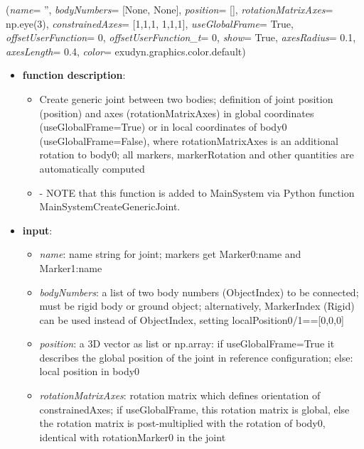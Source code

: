 %
\begin{flushleft}
\label{sec:mainsystemextensions:CreateGenericJoint}
({\it name}= '', {\it bodyNumbers}= [None, None], {\it position}= [], {\it rotationMatrixAxes}= np.eye(3), {\it constrainedAxes}= [1,1,1, 1,1,1], {\it useGlobalFrame}= True, {\it offsetUserFunction}= 0, {\it offsetUserFunction\_t}= 0, {\it show}= True, {\it axesRadius}= 0.1, {\it axesLength}= 0.4, {\it color}= exudyn.graphics.color.default)
\end{flushleft}
\setlength{\itemindent}{0.7cm}
\begin{itemize}[leftmargin=0.7cm]
\item[--]
{\bf function description}: \vspace{-6pt}
\begin{itemize}[leftmargin=1.2cm]
\setlength{\itemindent}{-0.7cm}
\item[]Create generic joint between two bodies; definition of joint position (position) and axes (rotationMatrixAxes) in global coordinates (useGlobalFrame=True) or in local coordinates of body0 (useGlobalFrame=False), where rotationMatrixAxes is an additional rotation to body0; all markers, markerRotation and other quantities are automatically computed
\item[]- NOTE that this function is added to MainSystem via Python function MainSystemCreateGenericJoint.
\end{itemize}
\item[--]
{\bf input}: \vspace{-6pt}
\begin{itemize}[leftmargin=1.2cm]
\setlength{\itemindent}{-0.7cm}
\item[]{\it name}: name string for joint; markers get Marker0:name and Marker1:name
\item[]{\it bodyNumbers}: a list of two body numbers (ObjectIndex) to be connected; must be rigid body or ground object; alternatively, MarkerIndex (Rigid) can be used instead of ObjectIndex, setting localPosition0/1==[0,0,0]
\item[]{\it position}: a 3D vector as list or np.array: if useGlobalFrame=True it describes the global position of the joint in reference configuration; else: local position in body0
\item[]{\it rotationMatrixAxes}: rotation matrix which defines orientation of constrainedAxes; if useGlobalFrame, this rotation matrix is global, else the rotation matrix is post-multiplied with the rotation of body0, identical with rotationMarker0 in the joint

\end{itemize}
\end{itemize}
